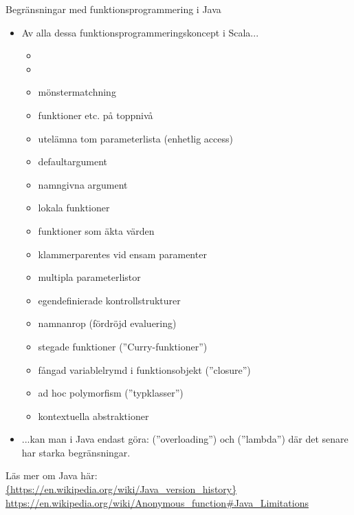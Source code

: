 \begin{Slide}{Begränsningar med funktionsprogrammering i Java}
\begin{itemize}\SlideFontTiny
\item[] Av alla dessa funktionsprogrammeringskoncept i Scala...
\begin{itemize}
\item {}
\item {}
\item mönstermatchning
\item funktioner etc. på toppnivå
\item utelämna tom parameterlista (enhetlig access)
\item defaultargument
\item namngivna argument
\item lokala funktioner
\item funktioner som äkta värden
\item klammerparentes vid ensam paramenter
\item multipla parameterlistor
\item egendefinierade kontrollstrukturer
\item namnanrop (fördröjd evaluering)
\item stegade funktioner (''Curry-funktioner'')
\item fångad variablelrymd i funktionsobjekt (''closure'')
\item ad hoc polymorfism (''typklasser'')
\item kontextuella abstraktioner
\end{itemize}
\item[] ...kan man i Java %
endast göra:  (''overloading'') och  (''lambda'') där det senare har starka begränsningar. %

\end{itemize}
\ifkompendium\else
\vfill{} 
\fi Läs mer om Java här:\\
\url{{https://en.wikipedia.org/wiki/Java_version_history}}
\url{https://en.wikipedia.org/wiki/Anonymous_function\#Java_Limitations}

\end{Slide}

